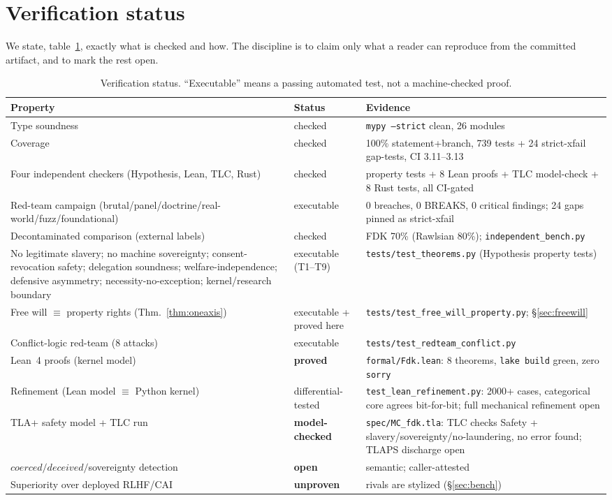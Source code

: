\documentclass[11pt]{article}
\begin{document}
\section{Verification status}
\label{sec:status}

We state, table~\ref{tab:status}, exactly what is checked and how. The discipline is to claim
only what a reader can reproduce from the committed artifact, and to mark the rest open.

\begin{table}[t]
\centering
\caption{Verification status. ``Executable'' means a passing automated test, not a
machine-checked proof.}
\label{tab:status}
\begin{tabular}{@{}p{}p{}p{}@{}}
\toprule
Property & Status & Evidence \\
\midrule
Type soundness & checked & \texttt{mypy --strict} clean, 26 modules \\
Coverage & checked & 100\% statement+branch, 739 tests + 24 strict-xfail gap-tests, CI 3.11--3.13 \\
Four independent checkers (Hypothesis, Lean, TLC, Rust) & checked & property tests + 8 Lean proofs + TLC model-check + 8 Rust tests, all CI-gated \\
Red-team campaign (brutal/panel/doctrine/real-world/fuzz/foundational) & executable & 0 breaches, 0 BREAKS, 0 critical findings; 24 gaps pinned as strict-xfail \\
Decontaminated comparison (external labels) & checked & FDK 70\% (Rawlsian 80\%); \texttt{independent\_bench.py} \\
No legitimate slavery; no machine sovereignty; consent-revocation safety; delegation soundness; welfare-independence; defensive asymmetry; necessity-no-exception; kernel/research boundary & executable (T1--T9) & \texttt{tests/test\_theorems.py} (Hypothesis property tests) \\
Free will $\equiv$ property rights (Thm.~\ref{thm:oneaxis}) & executable + proved here & \texttt{tests/test\_free\_will\_property.py}; \S\ref{sec:freewill} \\
Conflict-logic red-team (8 attacks) & executable & \texttt{tests/test\_redteam\_conflict.py} \\
Lean~4 proofs (kernel model) & \textbf{proved} & \texttt{formal/Fdk.lean}: 8 theorems, \texttt{lake build} green, zero \texttt{sorry} \\
Refinement (Lean model $\equiv$ Python kernel) & differential-tested & \texttt{test\_lean\_refinement.py}: 2000+ cases, categorical core agrees bit-for-bit; full mechanical refinement open \\
TLA+ safety model + TLC run & \textbf{model-checked} & \texttt{spec/MC\_fdk.tla}: TLC checks Safety + slavery/sovereignty/no-laundering, no error found; TLAPS discharge open \\
$\mathit{coerced}/\mathit{deceived}/$sovereignty detection & \textbf{open} & semantic; caller-attested \\
Superiority over deployed RLHF/CAI & \textbf{unproven} & rivals are stylized (\S\ref{sec:bench}) \\
\bottomrule
\end{tabular}
\end{table}
\end{document}
